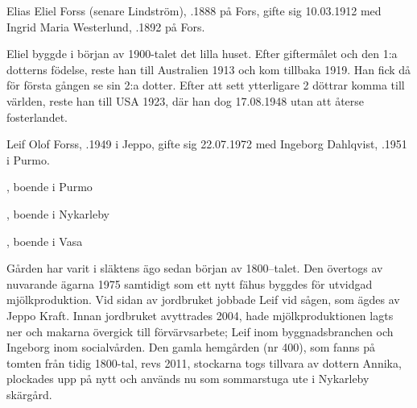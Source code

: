 Elias Eliel Forss (senare Lindström), .1888 på Fors, gifte sig 10.03.1912 med Ingrid Maria Westerlund, .1892  på Fors.

Eliel byggde i början av 1900-talet det lilla huset. Efter giftermålet och den 1:a dotterns födelse, reste han till Australien 1913 och kom tillbaka 1919. Han fick då för första gången se sin 2:a dotter. Efter att sett ytterligare 2 döttrar komma till världen, reste han till USA 1923, där han dog 17.08.1948 utan att återse fosterlandet.
\begin{jhchildren}
  \item {}
  \item {}
  \item {}
  \item {}
\end{jhchildren}






Leif Olof Forss, .1949 i Jeppo, gifte sig 22.07.1972 med Ingeborg Dahlqvist, .1951 i Purmo.
\begin{jhchildren}
  \item {}, boende i Purmo
  \item {}, boende i Nykarleby
  \item {}, boende i Vasa
\end{jhchildren}

Gården har varit i släktens ägo sedan början av 1800--talet. Den övertogs av nuvarande ägarna 1975 samtidigt som ett nytt fähus byggdes för utvidgad mjölkproduktion. Vid sidan av jordbruket jobbade Leif vid sågen, som ägdes av Jeppo Kraft. Innan jordbruket avyttrades 2004, hade mjölkproduktionen lagts ner och makarna övergick till förvärvsarbete; Leif inom byggnadsbranchen och Ingeborg inom socialvården. Den gamla hemgården (nr 400), som fanns på tomten från tidig 1800-tal, revs 2011, stockarna togs tillvara av dottern Annika, plockades upp på nytt och används nu som sommarstuga ute i Nykarleby skärgård.


